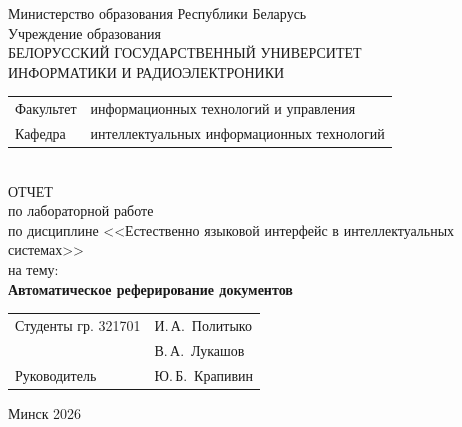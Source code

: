 \begin{titlepage}
	\begin{center}
		Министерство образования Республики Беларусь\\[1em]
		Учреждение образования\\
		БЕЛОРУССКИЙ ГОСУДАРСТВЕННЫЙ УНИВЕРСИТЕТ \\
		ИНФОРМАТИКИ И РАДИОЭЛЕКТРОНИКИ\\[1em]

		\begin{minipage}{\textwidth}
			\begin{flushleft}
				\begin{tabular}{ l l }
					Факультет & информационных технологий и управления     \\
					Кафедра   & интеллектуальных информационных технологий
				\end{tabular}
			\end{flushleft}
		\end{minipage}\\[1em]

		{ОТЧЕТ}\\
		{по лабораторной работе}\\
		{по дисциплине <<Естественно языковой интерфейс в интеллектуальных системах>>}\\
		{на тему:}\\[1em]
		\textbf{\large Автоматическое реферирование документов}\\[1em]

		\vspace{2em}
		\begin{tabular}{ p{}p{} }
			Студенты гр. 321701 & И.\,А.~Политыко \\
			                    & В.\,А.~Лукашов  \\
			Руководитель        & Ю.\,Б.~Крапивин \\
		\end{tabular}

		\vfill
		{\normalsize Минск 2026}
	\end{center}
\end{titlepage}
